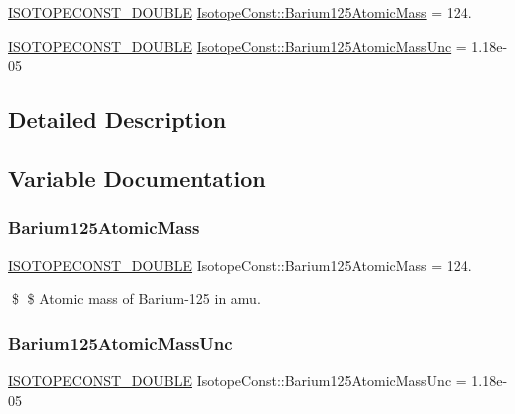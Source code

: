 \begin{DoxyCompactItemize}
\item 
\mbox{\hyperlink{group___isotope_const-_macros_ga8f45a7272ce02c0b4c65c44636ed719a}{I\+S\+O\+T\+O\+P\+E\+C\+O\+N\+S\+T\+\_\+\+D\+O\+U\+B\+LE}} \mbox{\hyperlink{group___isotope_const-_barium-_ba125_gadce20ae6b119a749542fa7845e68422a}{Isotope\+Const\+::\+Barium125\+Atomic\+Mass}} = 124.
\item 
\mbox{\hyperlink{group___isotope_const-_macros_ga8f45a7272ce02c0b4c65c44636ed719a}{I\+S\+O\+T\+O\+P\+E\+C\+O\+N\+S\+T\+\_\+\+D\+O\+U\+B\+LE}} \mbox{\hyperlink{group___isotope_const-_barium-_ba125_ga7331f07e84820c646cea45ff453fa342}{Isotope\+Const\+::\+Barium125\+Atomic\+Mass\+Unc}} = 1.\+18e-\/05
\end{DoxyCompactItemize}


\subsection{Detailed Description}


\subsection{Variable Documentation}
\mbox{\label{group___isotope_const-_barium-_ba125_gadce20ae6b119a749542fa7845e68422a}} 
\subsubsection{\texorpdfstring{Barium125\+Atomic\+Mass}{Barium125AtomicMass}}
{\footnotesize\ttfamily \mbox{\hyperlink{group___isotope_const-_macros_ga8f45a7272ce02c0b4c65c44636ed719a}{I\+S\+O\+T\+O\+P\+E\+C\+O\+N\+S\+T\+\_\+\+D\+O\+U\+B\+LE}} Isotope\+Const\+::\+Barium125\+Atomic\+Mass = 124.}

\$ \$ Atomic mass of Barium-\/125 in amu. \mbox{\label{group___isotope_const-_barium-_ba125_ga7331f07e84820c646cea45ff453fa342}} 
\subsubsection{\texorpdfstring{Barium125\+Atomic\+Mass\+Unc}{Barium125AtomicMassUnc}}
{\footnotesize\ttfamily \mbox{\hyperlink{group___isotope_const-_macros_ga8f45a7272ce02c0b4c65c44636ed719a}{I\+S\+O\+T\+O\+P\+E\+C\+O\+N\+S\+T\+\_\+\+D\+O\+U\+B\+LE}} Isotope\+Const\+::\+Barium125\+Atomic\+Mass\+Unc = 1.\+18e-\/05}

